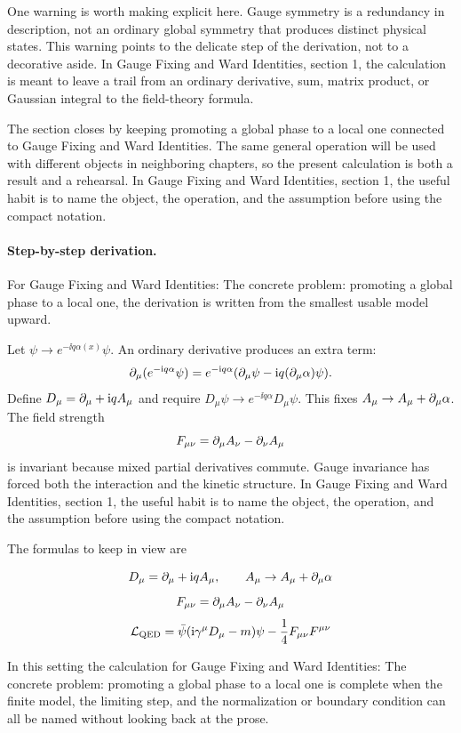One warning is worth making explicit here.  Gauge symmetry is a redundancy in description, not an ordinary global symmetry that produces distinct physical states.  This warning points to the delicate step of the derivation, not to a decorative aside.  In Gauge Fixing and Ward Identities, section 1, the calculation is meant to leave a trail from an ordinary derivative, sum, matrix product, or Gaussian integral to the field-theory formula.

The section closes by keeping promoting a global phase to a local one connected to Gauge Fixing and Ward Identities.  The same general operation will be used with different objects in neighboring chapters, so the present calculation is both a result and a rehearsal.  In Gauge Fixing and Ward Identities, section 1, the useful habit is to name the object, the operation, and the assumption before using the compact notation.



\paragraph{Step-by-step derivation.}

For Gauge Fixing and Ward Identities: The concrete problem: promoting a global phase to a local one, the derivation is written from the smallest usable model upward.

Let \(\psi\to e^{-\ii q\alpha(x)}\psi\).  An ordinary derivative produces an extra term:
\[
  \partial_\mu(e^{-\mathrm i q\alpha}\psi)
  =
  e^{-\mathrm i q\alpha}(\partial_\mu\psi-\mathrm i q(\partial_\mu\alpha)\psi).
\]
Define \(D_\mu=\partial_\mu+\mathrm i qA_\mu\) and require \(D_\mu\psi\to e^{-\ii q\alpha}D_\mu\psi\).  This fixes \(A_\mu\to A_\mu+\partial_\mu\alpha\).  The field strength
\[
  F_{\mu\nu}=\partial_\mu A_\nu-\partial_\nu A_\mu
\]
is invariant because mixed partial derivatives commute.  Gauge invariance has forced both the interaction and the kinetic structure.  In Gauge Fixing and Ward Identities, section 1, the useful habit is to name the object, the operation, and the assumption before using the compact notation.

The formulas to keep in view are

\[
  D_\mu=\partial_\mu+\mathrm i qA_\mu,\qquad A_\mu\to A_\mu+\partial_\mu\alpha
\]
\[
  F_{\mu\nu}=\partial_\mu A_\nu-\partial_\nu A_\mu
\]
\[
  \mathcal L_{\mathrm{QED}}=\bar\psi(\mathrm i\gamma^\mu D_\mu-m)\psi-\frac14F_{\mu\nu}F^{\mu\nu}
\]

In this setting the calculation for Gauge Fixing and Ward Identities: The concrete problem: promoting a global phase to a local one is complete when the finite model, the limiting step, and the normalization or boundary condition can all be named without looking back at the prose.




